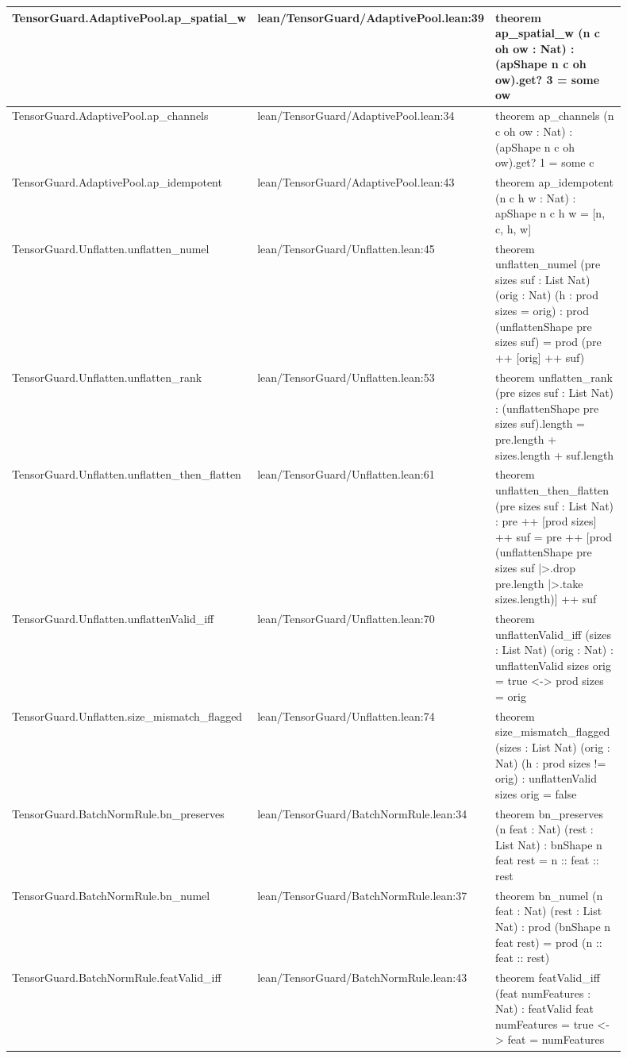 \documentclass[10pt]{article}
\begin{document}
\begin{longtable}{|p{0.30\linewidth}|p{0.14\linewidth}|p{0.46\linewidth}|}
\hline
TensorGuard.AdaptivePool.ap\_spatial\_w & lean/TensorGuard/AdaptivePool.lean:39 & theorem ap\_spatial\_w (n c oh ow : Nat) : (apShape n c oh ow).get? 3 = some ow \\
\hline
TensorGuard.AdaptivePool.ap\_channels & lean/TensorGuard/AdaptivePool.lean:34 & theorem ap\_channels (n c oh ow : Nat) : (apShape n c oh ow).get? 1 = some c \\
\hline
TensorGuard.AdaptivePool.ap\_idempotent & lean/TensorGuard/AdaptivePool.lean:43 & theorem ap\_idempotent (n c h w : Nat) : apShape n c h w = [n, c, h, w] \\
\hline
TensorGuard.Unflatten.unflatten\_numel & lean/TensorGuard/Unflatten.lean:45 & theorem unflatten\_numel (pre sizes suf : List Nat) (orig : Nat) (h : prod sizes = orig) : prod (unflattenShape pre sizes suf) = prod (pre ++ [orig] ++ suf) \\
\hline
TensorGuard.Unflatten.unflatten\_rank & lean/TensorGuard/Unflatten.lean:53 & theorem unflatten\_rank (pre sizes suf : List Nat) : (unflattenShape pre sizes suf).length = pre.length + sizes.length + suf.length \\
\hline
TensorGuard.Unflatten.unflatten\_then\_flatten & lean/TensorGuard/Unflatten.lean:61 & theorem unflatten\_then\_flatten (pre sizes suf : List Nat) : pre ++ [prod sizes] ++ suf = pre ++ [prod (unflattenShape pre sizes suf |>.drop pre.length |>.take sizes.length)] ++ suf \\
\hline
TensorGuard.Unflatten.unflattenValid\_iff & lean/TensorGuard/Unflatten.lean:70 & theorem unflattenValid\_iff (sizes : List Nat) (orig : Nat) : unflattenValid sizes orig = true <-> prod sizes = orig \\
\hline
TensorGuard.Unflatten.size\_mismatch\_flagged & lean/TensorGuard/Unflatten.lean:74 & theorem size\_mismatch\_flagged (sizes : List Nat) (orig : Nat) (h : prod sizes != orig) : unflattenValid sizes orig = false \\
\hline
TensorGuard.BatchNormRule.bn\_preserves & lean/TensorGuard/BatchNormRule.lean:34 & theorem bn\_preserves (n feat : Nat) (rest : List Nat) : bnShape n feat rest = n :: feat :: rest \\
\hline
TensorGuard.BatchNormRule.bn\_numel & lean/TensorGuard/BatchNormRule.lean:37 & theorem bn\_numel (n feat : Nat) (rest : List Nat) : prod (bnShape n feat rest) = prod (n :: feat :: rest) \\
\hline
TensorGuard.BatchNormRule.featValid\_iff & lean/TensorGuard/BatchNormRule.lean:43 & theorem featValid\_iff (feat numFeatures : Nat) : featValid feat numFeatures = true <-> feat = numFeatures \\

\end{longtable}
\end{document}
